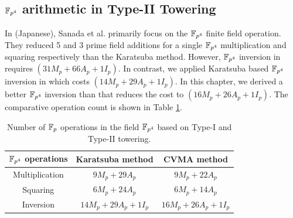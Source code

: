 \subsection{\texorpdfstring{$\mathbb{F}_{p^4}$ }{}arithmetic in Type-II Towering}   
In \cite{cvma_sanada} (Japanese), Sanada et al. primarily focus on the $\mathbb{F}_{p^4}$ finite field operation.
They reduced 5 and 3 prime field additions for a single $\mathbb{F}_{p^4}$ multiplication and squaring respectively than the Karatsuba method.
However, $\mathbb{F}_{p^4}$ inversion in \cite{cvma_sanada} requires $(31 M_p +66A_p+1I_p)$.
In contrast, we applied Karatsuba based $\mathbb{F}_{p^4}$ inversion in \cite{INDOCRYPT:KNGDNK17} which costs $(14 M_p +29A_p+1I_p)$.
In this chapter, we derived a better $\mathbb{F}_{p^4}$ inversion than \cite{cvma_sanada} that reduces the cost to $(16M_p+26A_p+1I_p)$. 
The comparative operation count is shown in Table \ref{tab_fp4_operation}.
\renewcommand{\baselinestretch}{1.5}
\begin{table}[ht]
	\centering
		\caption{Number of ${\mathbb{F}}_{p}$ operations in the field $\mathbb{F}_{p^4}$ based on Type-I and Type-II towering.}
		\label{tab_fp4_operation}
	\begin{tabular}{|c|c|c|}
		\hline
		$\mathbb{F}_{p^4}  $ operations & Karatsuba method               & CVMA  method \\
		\hline
		Multiplication    & $9M_p + 29A_p$     & $9M_p+22A_p$       \\ \hline
		Squaring          & $6M_p+24A_p$       & $6M_p+14A_p$       \\ \hline
		Inversion         & $14M_p+29A_p+1I_p$ & $16M_p+26A_p+1I_p$ \\ \hline
	\end{tabular}
\end{table}
\renewcommand{\baselinestretch}{1.0}
